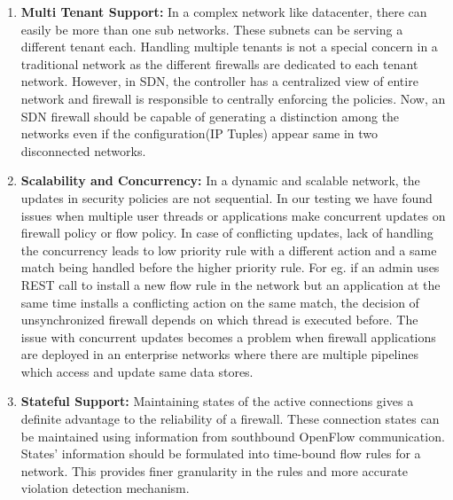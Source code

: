 \begin{enumerate}
	\item \textbf{Multi Tenant Support: }
	In a complex network like datacenter, there can easily be more than one sub networks. These subnets can be serving a different tenant each. Handling multiple tenants is not a special concern in a traditional network as the different firewalls are dedicated to each tenant network. However, in SDN, the controller has a centralized view of entire network and firewall is responsible to centrally enforcing the policies. Now, an SDN firewall should be capable of generating a distinction among the networks even if the configuration(IP Tuples) appear same in two disconnected networks.
	\item \textbf{Scalability and Concurrency: }
	In a dynamic and scalable network, the updates in security policies are not sequential. In our testing we have found issues when multiple user threads or applications make concurrent updates on firewall policy or flow policy. In case of conflicting updates, lack of handling the concurrency leads to low priority rule with a different action and a same match being handled before the higher priority rule. For eg. if an admin uses REST call to install a new flow rule in the network but an application at the same time installs a conflicting action on the same match, the decision of unsynchronized firewall depends on which thread is executed before. The issue with concurrent updates becomes a problem when firewall applications are deployed in an enterprise networks where there are multiple pipelines which access and update same data stores.
	\item \textbf{Stateful Support: }
	Maintaining states of the active connections gives a definite advantage to the reliability of a firewall. These connection states can be maintained using information from southbound OpenFlow communication. States' information should be formulated into time-bound flow rules for a network. This provides finer granularity in the rules and more accurate violation detection mechanism.
\end{enumerate}

